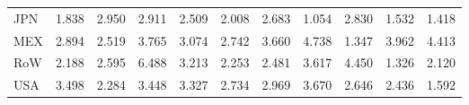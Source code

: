 \begin{table}[htbp]
\begin{tabular}{lcccccccccc}
  JPN & \textcolor[RGB]{224,145,31}{1.838} & \textcolor[RGB]{138,89,117}{2.950} & \textcolor[RGB]{143,92,112}{2.911} & \textcolor[RGB]{189,122,66}{2.509} & \textcolor[RGB]{219,142,36}{2.008} & \textcolor[RGB]{168,109,87}{2.683} & \textcolor[RGB]{250,162,5}{1.054} & \textcolor[RGB]{150,97,105}{2.830} & \textcolor[RGB]{230,148,26}{1.532} & \textcolor[RGB]{237,153,18}{1.418} \\ 
  MEX & \textcolor[RGB]{145,94,110}{2.894} & \textcolor[RGB]{186,120,69}{2.519} & \textcolor[RGB]{89,58,166}{3.765} & \textcolor[RGB]{130,84,125}{3.074} & \textcolor[RGB]{161,104,94}{2.742} & \textcolor[RGB]{94,61,161}{3.660} & \textcolor[RGB]{56,36,199}{4.738} & \textcolor[RGB]{240,155,15}{1.347} & \textcolor[RGB]{84,54,171}{3.962} & \textcolor[RGB]{71,46,184}{4.413} \\ 
  RoW & \textcolor[RGB]{214,139,41}{2.188} & \textcolor[RGB]{176,114,79}{2.595} & \textcolor[RGB]{36,23,219}{6.488} & \textcolor[RGB]{120,78,135}{3.213} & \textcolor[RGB]{201,130,54}{2.253} & \textcolor[RGB]{191,124,64}{2.481} & \textcolor[RGB]{97,63,158}{3.617} & \textcolor[RGB]{69,45,186}{4.450} & \textcolor[RGB]{242,157,13}{1.326} & \textcolor[RGB]{217,140,38}{2.120} \\ 
  USA & \textcolor[RGB]{105,68,150}{3.498} & \textcolor[RGB]{199,129,56}{2.284} & \textcolor[RGB]{107,69,148}{3.448} & \textcolor[RGB]{115,74,140}{3.327} & \textcolor[RGB]{163,106,92}{2.734} & \textcolor[RGB]{135,87,120}{2.969} & \textcolor[RGB]{92,59,163}{3.670} & \textcolor[RGB]{171,111,84}{2.646} & \textcolor[RGB]{194,125,61}{2.436} & \textcolor[RGB]{227,147,28}{1.592} \\ 
   \hline
\end{tabular}
\end{table}
